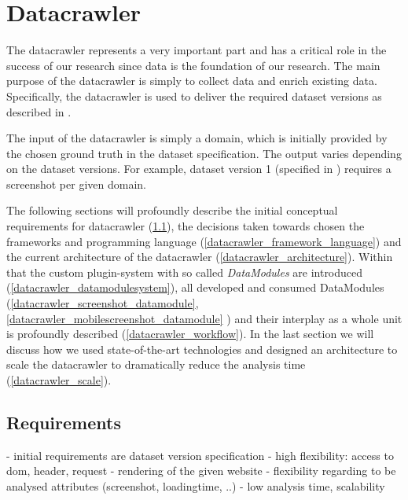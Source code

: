 \section{Datacrawler}
\label{Datacrawler}
The datacrawler represents a very important part and has a critical role in the success of our research since data is the foundation of our research. The main purpose of the datacrawler is simply to collect data and enrich existing data. Specifically, the datacrawler is used to deliver the required dataset versions as described in \label{dataset} .

The input of the datacrawler is simply a domain, which is initially provided by the chosen ground truth in the dataset specification. The output varies depending on the dataset versions. For example, dataset version 1 (specified in \label{datasetversion1})  requires a screenshot per given domain.

The following sections will profoundly describe the initial conceptual requirements for datacrawler (\ref{datacrawler_requirements}), the decisions taken towards chosen the frameworks and programming language (\ref{datacrawler_framework_language}) and the current architecture of the datacrawler (\ref{datacrawler_architecture}). Within that the custom plugin-system with so called \textit{DataModules} are introduced (\ref{datacrawler_datamodulesystem}), all developed and consumed DataModules (\ref{datacrawler_screenshot_datamodule}, \ref{datacrawler_mobilescreenshot_datamodule} ) and their interplay as a whole unit is profoundly described (\ref{datacrawler_workflow}).  In the last section we will discuss how we used state-of-the-art technologies and designed an architecture to scale the datacrawler to dramatically reduce the analysis time (\ref{datacrawler_scale}).

\subsection{Requirements}
\label{datacrawler_requirements}
- initial requirements are dataset version specification
- high flexibility: access to dom, header, request
- rendering of the given website
- flexibility regarding to be analysed attributes (screenshot, loadingtime, ..)
- low analysis time, scalability

